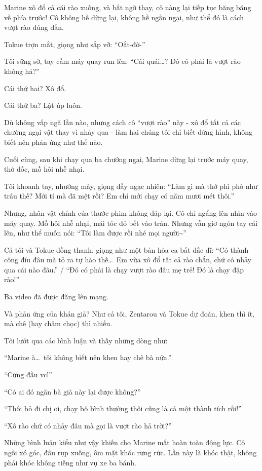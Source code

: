 \documentclass[../main.tex]{subfiles}
\begin{document}
Marine xô đổ cả cái rào xuống, và bất ngờ thay, cô nàng lại tiếp tục băng băng về phía trước! Cô không hề dừng lại, không hề ngần ngại, như thể đó là cách vượt rào đúng đắn.


Tokue trợn mắt, giọng như sắp vỡ: ``Oắt-đờ-''

Tôi sững sờ, tay cầm máy quay run lên: ``Cái quái\dots? Đó có phải là vượt rào không hả?''

Cái thứ hai? Xô đổ.

Cái thứ ba? Lật úp luôn.

Dù không vấp ngã lần nào, nhưng cách cô ``vượt rào'' này - xô đổ tất cả các chướng ngại vật thay vì nhảy qua - làm hai chúng tôi chỉ biết đứng hình, không biết nên phản ứng như thế nào.

Cuối cùng, sau khi chạy qua ba chướng ngại, Marine dừng lại trước máy quay, thở dốc, mồ hôi nhễ nhại.

Tôi khoanh tay, nhướng mày, giọng đầy ngạc nhiên: ``Làm gì mà thở phì phò như trâu thế? Mới tí mà đã mệt rồi? Em chỉ mới chạy có năm mươi mét thôi.''

Nhưng, nhân vật chính của thước phim không đáp lại. Cô chỉ ngẩng lên nhìn vào máy quay. Mồ hôi nhễ nhại, mái tóc đỏ bết vào trán. Nhưng vẫn giơ ngón tay cái lên, như thể muốn nói: ``Tôi làm được rồi nhé mọi người\~{}''


Cả tôi và Tokue đồng thanh, giọng như một bản hòa ca bất đắc dĩ: ``Có thành công đíu đâu mà tỏ ra tự hào thế\dots\ Em vừa xô đổ tất cả rào chắn, chứ có nhảy qua cái nào đâu.'' / ``Đó có phải là chạy vượt rào đâu mẹ trẻ! Đó là chạy đập rào!''

\il

Ba video đã được đăng lên mạng.

Và phản ứng của khán giả? Như cả tôi, Zentarou và Tokue dự đoán, khen thì ít, mà chê (hay châm chọc) thì nhiều.

Tôi lướt qua các bình luận và thấy những dòng như:

``Marine à\dots\ tôi không biết nên khen hay chê bà nữa.''

``Cứng đầu vcl''

``Có ai đó ngăn bà già này lại được không?''

``Thôi bỏ đi chị ơi, chạy bộ bình thường thôi cũng là cả một thành tích rồi!''

``Xô rào chứ có nhảy đâu mà gọi là vượt rào hả trời?''

Những bình luận kiểu như vậy khiến cho Marine mất hoàn toàn động lực. Cô ngồi xó góc, đầu rụp xuống, ôm mặt khóc rưng rức. Lần này là khóc thật, không phải khóc không tiếng như vụ xe ba bánh.
\end{document}
